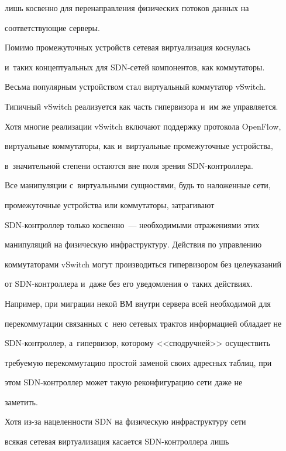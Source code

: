 лишь косвенно для пе\-ре\-на\-прав\-ле\-ния физических потоков данных на 


соответствующие серверы.


    


    Помимо промежуточных устройств сетевая виртуализация коснулась 


и~таких концептуальных для SDN-се\-тей компонентов, как коммутаторы. 


Весьма популярным устройством стал виртуальный коммутатор vSwitch. 


Типичный vSwitch реализуется как часть гипервизора и~им же управ\-ля\-ет\-ся. 


Хотя многие реализации vSwitch включают поддержку протокола OpenFlow, 


виртуальные коммутаторы, как и~виртуальные промежуточные устройства, 


в~значительной степени остаются вне поля зрения SDN-конт\-рол\-ле\-ра. 


Все манипуляции с~виртуальными сущностями, будь то наложенные сети, 


промежуточные устройства или коммутаторы, затрагивают  


SDN-конт\-рол\-лер только косвенно~--- необходимыми отражениями этих 


манипуляций на физическую инфраструктуру. Действия по управ\-ле\-нию 


коммутаторами vSwitch могут производиться гипервизором без целеуказаний 


от SDN-конт\-рол\-ле\-ра и~даже без его уведомления о~таких действиях. 


Например, при миграции некой ВМ внут\-ри сервера всей необходимой для 


перекоммутации связанных с~нею сетевых трактов информацией обладает не  


SDN-конт\-рол\-лер, а~гипервизор, которому <<сподручней>> осуществить 


требуемую перекоммутацию простой заменой своих адресных таб\-лиц, при 


этом SDN-конт\-рол\-лер может такую реконфигурацию сети даже не 


заметить.


    


    Хотя из-за нацеленности SDN на физическую инфраструктуру сети 


всякая сетевая виртуализация касается SDN-конт\-рол\-ле\-ра лишь 



